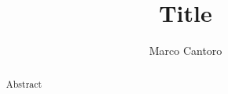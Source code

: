 \documentclass[final,5p,times,12pt,sort&compress,longtitle]{elsarticle}
\begin{document}
\begin{frontmatter}

  \title{Title}

  \author{Marco Cantoro%
  }
  \address{Personal Home, V. P. Sottocorno 52, 20129 MI Milan,
  Italy}

  \begin{abstract}
    Abstract
  \end{abstract}

  \begin{keyword}
  \end{keyword}

\end{frontmatter}



\end{document}
